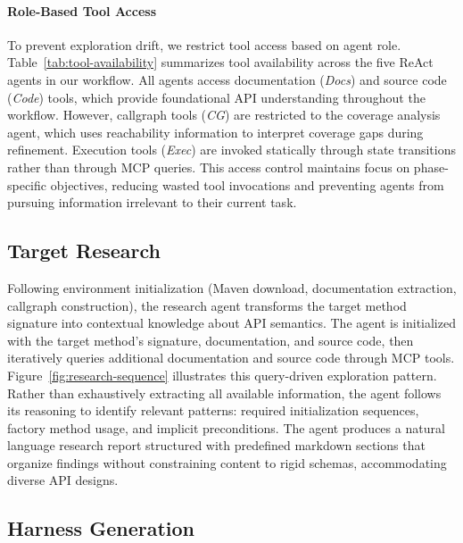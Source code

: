\paragraph{Role-Based Tool Access}
To prevent exploration drift, we restrict tool access based on agent role. Table~\ref{tab:tool-availability} summarizes tool availability across the five ReAct agents in our workflow. All agents access documentation (\textit{Docs}) and source code (\textit{Code}) tools, which provide foundational API understanding throughout the workflow. However, callgraph tools (\textit{CG}) are restricted to the coverage analysis agent, which uses reachability information to interpret coverage gaps during refinement. Execution tools (\textit{Exec}) are invoked statically through state transitions rather than through MCP queries. This access control maintains focus on phase-specific objectives, reducing wasted tool invocations and preventing agents from pursuing information irrelevant to their current task.


%
\subsection{Target Research}%
\label{subsec:target-research}

Following environment initialization (Maven download, documentation extraction, callgraph construction), the research agent transforms the target method signature into contextual knowledge about API semantics. The agent is initialized with the target method's signature, documentation, and source code, then iteratively queries additional documentation and source code through MCP tools. Figure~\ref{fig:research-sequence} illustrates this query-driven exploration pattern. Rather than exhaustively extracting all available information, the agent follows its reasoning to identify relevant patterns: required initialization sequences, factory method usage, and implicit preconditions. The agent produces a natural language research report structured with predefined markdown sections that organize findings without constraining content to rigid schemas, accommodating diverse API designs.

\subsection{Harness Generation}%
\label{subsec:harness-generation}

